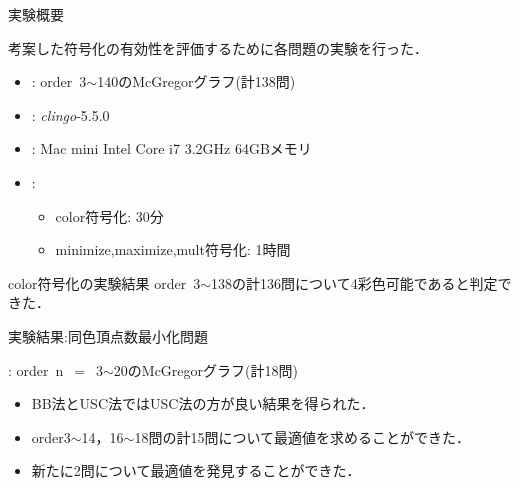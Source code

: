 \documentclass[dvipdfmx,11pt]{beamer}
\begin{document}
\begin{frame}{実験概要}
 \begin{block}{}
  考案した符号化の有効性を評価するために各問題の実験を行った．
 \end{block}

\begin{itemize}
 \item {}: order~3$\sim$140のMcGregorグラフ(計138問)
 \item {}: \textit{clingo}-5.5.0
 \item {}: Mac mini Intel Core i7 3.2GHz 64GBメモリ
 \item {}: 
       \begin{itemize}%
        \item color符号化: 30分
        \item minimize,maximize,mult符号化: 1時間
       \end{itemize}
\end{itemize}  

 \begin{alertblock}{color符号化の実験結果}
  order~3$\sim$138の計136問について4彩色可能であると判定できた．
 \end{alertblock}
 
\end{frame}


\begin{frame}{実験結果:同色頂点数最小化問題}

 \begin{block}{}
  : order\ n~$=$~3$\sim$20のMcGregorグラフ(計18問)
 \end{block}

 \begin{center}
  
 \end{center}

 \begin{itemize}
  \item BB法とUSC法ではUSC法の方が良い結果を得られた．
  \item order3$\sim$14，16$\sim$18問の計15問について最適値を求めることができた．
  \item 新たに2問について最適値を発見することができた．
 \end{itemize}
 
\end{frame}
\end{document}
